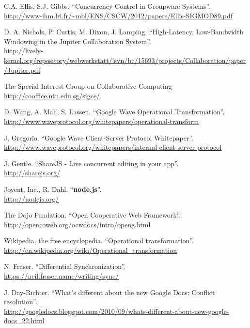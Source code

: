 \documentclass[a4paper, 12pt, twoside]{book}
\begin{document}
\begin{thebibliography}{99}

 C.A. Ellis, S.J. Gibbs. “Concurrency Control in Groupware Systems”.
\\\url{http://www-ihm.lri.fr/~mbl/ENS/CSCW/2012/papers/Ellis-SIGMOD89.pdf}

 D. A. Nichols, P. Curtis, M. Dixon, J. Lamping. “High-Latency, Low-Bandwidth Windowing in the Jupiter Collaboration System”.
\\\url{http://lively-kernel.org/repository/webwerkstatt/!svn/bc/15693/projects/Collaboration/paper/Jupiter.pdf}

 The Special Interest Group on Collaborative Computing
\\\url{http://cooffice.ntu.edu.sg/sigce/}

 D. Wang, A. Mah, S. Lassen. “Google Wave Operational Transformation”.
\\\url{http://www.waveprotocol.org/whitepapers/operational-transform}

 J. Gregorio. “Google Wave Client-Server Protocol Whitepaper”.
\\\url{http://www.waveprotocol.org/whitepapers/internal-client-server-protocol}

 J. Gentle. “ShareJS - Live concurrent editing in your app”.
\\\url{http://sharejs.org/}

 Joyent, Inc., R. Dahl. “\textbf{node.js}”.
\\\url{http://nodejs.org/}

 The Dojo Fundation. “Open Cooperative Web Framework”.
\\\url{http://opencoweb.org/ocwdocs/intro/openg.html}

 Wikipedia, the free encyclopedia. “Operational transformation”.
\\\url{http://en.wikipedia.org/wiki/Operational_transformation}

 N. Fraser. “Differential Synchronization”.
\\\url{https://neil.fraser.name/writing/sync/}

 J. Day-Richter. “What’s different about the new Google Docs: Conflict resolution”.
\\\url{http://googledocs.blogspot.com/2010/09/whats-different-about-new-google-docs_22.html}


\end{thebibliography}
\end{document}
